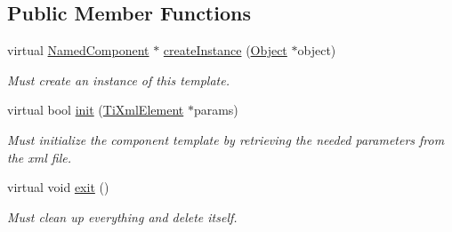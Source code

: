 \subsection*{\-Public \-Member \-Functions}
\begin{DoxyCompactItemize}
\item 
\hypertarget{classComponentTemplateCharacterController_a49176d56755b6d39c99abf70cf781a7f}{
virtual \hyperlink{classNamedComponent}{\-Named\-Component} $\ast$ \hyperlink{classComponentTemplateCharacterController_a49176d56755b6d39c99abf70cf781a7f}{create\-Instance} (\hyperlink{classObject}{\-Object} $\ast$object)}
\label{d5/d37/classComponentTemplateCharacterController_a49176d56755b6d39c99abf70cf781a7f}

\begin{DoxyCompactList}\small\item\em \-Must create an instance of this template. \end{DoxyCompactList}\item 
\hypertarget{classComponentTemplateCharacterController_aadc4c7f88c289b9ca5708eedb1bc2f41}{
virtual bool \hyperlink{classComponentTemplateCharacterController_aadc4c7f88c289b9ca5708eedb1bc2f41}{init} (\hyperlink{classTiXmlElement}{\-Ti\-Xml\-Element} $\ast$params)}
\label{d5/d37/classComponentTemplateCharacterController_aadc4c7f88c289b9ca5708eedb1bc2f41}

\begin{DoxyCompactList}\small\item\em \-Must initialize the component template by retrieving the needed parameters from the xml file. \end{DoxyCompactList}\item 
\hypertarget{classComponentTemplateCharacterController_a02376ca04c064b6e369904fc956fcfe0}{
virtual void \hyperlink{classComponentTemplateCharacterController_a02376ca04c064b6e369904fc956fcfe0}{exit} ()}
\label{d5/d37/classComponentTemplateCharacterController_a02376ca04c064b6e369904fc956fcfe0}

\begin{DoxyCompactList}\small\item\em \-Must clean up everything and delete itself. \end{DoxyCompactList}\end{DoxyCompactItemize}
